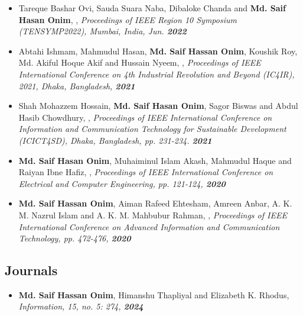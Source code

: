 \documentclass[margin]{res}
\begin{document}
\begin{resume}
\begin{itemize}
\item Tareque Bashar Ovi, Sauda Suara Naba, Dibaloke Chanda and \textbf{Md. Saif Hasan Onim},  , \textit{Proceedings of  IEEE Region 10 Symposium (TENSYMP2022), Mumbai, India, Jun. \textbf{2022}}

\item Abtahi Ishmam, Mahmudul Hasan, \textbf{Md. Saif Hassan Onim}, Koushik Roy, Md. Akiful Hoque Akif and Hussain Nyeem, , \textit{Proceedings of IEEE  International Conference on 4th Industrial Revolution and Beyond (IC4IR), 2021, Dhaka, Bangladesh, \textbf{2021}}

\item Shah Mohazzem Hossain, \textbf{Md. Saif Hasan Onim}, Sagor Biswas and Abdul Hasib Chowdhury, , \textit{Proceedings of IEEE  International Conference on Information and Communication Technology for Sustainable Development (ICICT4SD), Dhaka, Bangladesh, pp. 231-234. \textbf{2021}}

\item \textbf{Md. Saif Hasan Onim}, Muhaiminul Islam Akash, Mahmudul Haque and Raiyan Ibne Hafiz, , \textit{Proceedings of IEEE International Conference on Electrical and Computer Engineering, pp. 121-124, \textbf{2020}}

\item \textbf{Md. Saif Hassan Onim}, Aiman Rafeed Ehtesham, Amreen Anbar, A. K. M. Nazrul Islam and A. K. M. Mahbubur Rahman, , \textit{Proceedings of IEEE International Conference on Advanced Information and Communication Technology, pp. 472-476, \textbf{2020}}


\end{itemize}
\subsection{Journals}
\begin{itemize}

\item \textbf{Md. Saif Hassan Onim}, Himanshu Thapliyal and Elizabeth K. Rhodus,  \textit{Information, 15, no. 5: 274, \textbf{2024}}



\end{itemize}
\end{resume}
\end{document}
